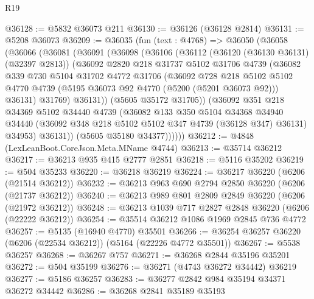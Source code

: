 \begin{lexlean}{R19}
\begin{coremodule}
{{{{{{{{{{{@36128 := @5832 @36073 @211
@36130 := @36126 (@36128 @2814)
@36131 := @5208 @36073
@36209 := @36035
    (fun (text : @4768) =>
    @36050
      (@36058
        (@36066
          (@36081
            (@36091
              (@36098
                (@36106
                  (@36112
                    (@36120 (@36130 @36131) (@32397 @2813))
                    (@36092
                      @2820
                      @218
                      @31737
                      @5102
                      @31706
                      @4739
                      (@36082
                        @339
                        @730
                        @5104
                        @31702
                        @4772
                        @31706
                        (@36092
                          @728
                          @218
                          @5102
                          @5102
                          @4770
                          @4739
                          (@5195 @36073 @92 @4770 (@5200 (@5201 @36073 @92)))
                          @36131)
                        @31769)
                      @36131))
                  (@5605 @35172 @31705))
                (@36092
                  @351
                  @218
                  @34369
                  @5102
                  @34440
                  @4739
                  (@36082
                    @133
                    @350
                    @5104
                    @34368
                    @34940
                    @34440
                    (@36092 @348 @218 @5102 @5102 @347 @4739 (@36128 @347) @36131)
                    @34953)
                  @36131))
              (@5605 @35180 @34377))))))
@36212 := @4848 (LexLeanBoot.CoreJson.Meta.MName @4744)
@36213 := @35714 @36212
@36217 := @36213 @935 @415 @2777 @2851
@36218 := @5116 @35202
@36219 := @504 @35233
@36220 := @36218 @36219
@36224 := @36217 @36220 (@6206 (@21514 @36212))
@36232 := @36213 @963 @690 @2794 @2850 @36220 (@6206 (@21737 @36212))
@36240 := @36213 @989 @801 @2809 @2849 @36220 (@6206 (@21972 @36212))
@36248 := @36213 @1039 @717 @2827 @2848 @36220 (@6206 (@22222 @36212))
@36254 := @35514 @36212 @1086 @1969 @2845 @736 @4772
@36257 := @5135 (@16940 @4770) @35501
@36266 := @36254 @36257 @36220 (@6206 (@22534 @36212)) (@5164 (@22226 @4772 @35501))
@36267 := @5538 @36257
@36268 := @36267 @757
@36271 := @36268 @2844 @35196 @35201
@36272 := @504 @35199
@36276 := @36271 (@4743 @36272 @34442) @36219
@36277 := @5186 @36257
@36283 := @36277 @2842 @984 @35194 @34371 @36272 @34442
@36286 := @36268 @2841 @35189 @35193
}}}}}}}}}}}
\end{coremodule}
\end{lexlean}

